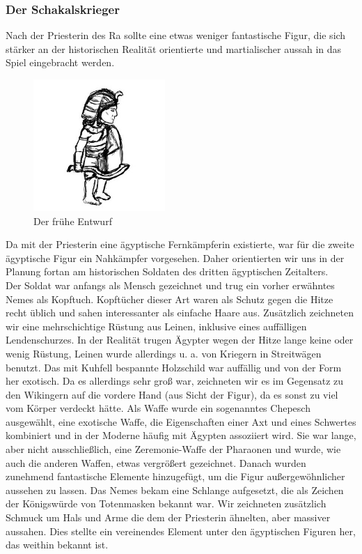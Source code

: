 \documentclass[extern,palatino]{cgBA}
\begin{document}
\subsubsection{Der Schakalskrieger}
Nach der Priesterin des Ra sollte eine etwas weniger fantastische Figur, die sich stärker an der historischen Realität orientierte und martialischer aussah in das Spiel eingebracht werden. 
\begin{figure}[H]
	\centering
	\includegraphics[height=5cm]{jackalalpha.jpg}
	\caption{Der frühe  Entwurf}
	\label{jackalalpha
	}
\end{figure} 
Da mit der Priesterin eine ägyptische Fernkämpferin existierte, war für die zweite ägyptische Figur ein Nahkämpfer vorgesehen. Daher orientierten wir uns in der Planung fortan am historischen Soldaten des dritten ägyptischen Zeitalters.
\\Der Soldat war anfangs als Mensch gezeichnet und trug ein vorher erwähntes Nemes als Kopftuch. Kopftücher dieser Art waren als Schutz gegen die Hitze recht üblich und sahen interessanter als einfache Haare aus. Zusätzlich zeichneten wir eine mehrschichtige Rüstung aus Leinen, inklusive eines auffälligen Lendenschurzes. In der Realität trugen Ägypter wegen der Hitze lange keine oder wenig Rüstung\cite{egynoarm}, Leinen wurde allerdings u. a. von Kriegern in Streitwägen benutzt. Das mit Kuhfell bespannte Holzschild war auffällig und von der Form her exotisch. Da es allerdings sehr groß war, zeichneten wir es im Gegensatz zu den Wikingern auf die vordere Hand (aus Sicht der Figur), da es sonst zu viel vom Körper verdeckt hätte. Als Waffe wurde ein sogenanntes Chepesch ausgewählt, eine exotische Waffe, die Eigenschaften einer Axt und eines Schwertes kombiniert und in der Moderne häufig mit Ägypten assoziiert wird\cite{chep}. Sie war lange, aber nicht ausschließlich, eine Zeremonie-Waffe der Pharaonen und wurde, wie auch die anderen Waffen, etwas vergrößert gezeichnet. 
Danach wurden zunehmend fantastische Elemente hinzugefügt, um die Figur außergewöhnlicher aussehen zu lassen. Das Nemes bekam eine Schlange aufgesetzt, die als Zeichen der Königswürde von Totenmasken bekannt war. Wir zeichneten zusätzlich Schmuck um Hals und Arme die dem der Priesterin ähnelten, aber massiver aussahen. Dies stellte ein vereinendes Element unter den ägyptischen Figuren her, das weithin bekannt ist. 
\end{document}
